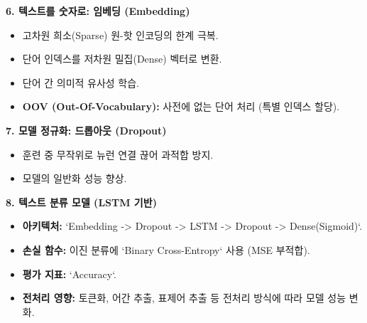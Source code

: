 \documentclass[11pt,a4paper]{article}
\begin{document}
\begin{tcolorbox}[title=\textbf{CSCI89 Lecture 3 핵심 요약}, colback=myblue!10!white, colframe=myblue!75!black, sharp corners, boxsep=3mm, left=3mm, right=3mm, top=3mm, bottom=3mm]
\textbf{6. 텍스트를 숫자로: 임베딩 (Embedding)}
\begin{itemize}
    \item 고차원 희소(Sparse) 원-핫 인코딩의 한계 극복.
    \item 단어 인덱스를 저차원 밀집(Dense) 벡터로 변환.
    \item 단어 간 의미적 유사성 학습.
    \item \textbf{OOV (Out-Of-Vocabulary):} 사전에 없는 단어 처리 (특별 인덱스 할당).
\end{itemize}

\textbf{7. 모델 정규화: 드롭아웃 (Dropout)}
\begin{itemize}
    \item 훈련 중 무작위로 뉴런 연결 끊어 과적합 방지.
    \item 모델의 일반화 성능 향상.
\end{itemize}

\textbf{8. 텍스트 분류 모델 (LSTM 기반)}
\begin{itemize}
    \item \textbf{아키텍처:} `Embedding -> Dropout -> LSTM -> Dropout -> Dense(Sigmoid)`.
    \item \textbf{손실 함수:} 이진 분류에 `Binary Cross-Entropy` 사용 (MSE 부적합).
    \item \textbf{평가 지표:} `Accuracy`.
    \item \textbf{전처리 영향:} 토큰화, 어간 추출, 표제어 추출 등 전처리 방식에 따라 모델 성능 변화.
\end{itemize}
\end{tcolorbox}
\end{document}
